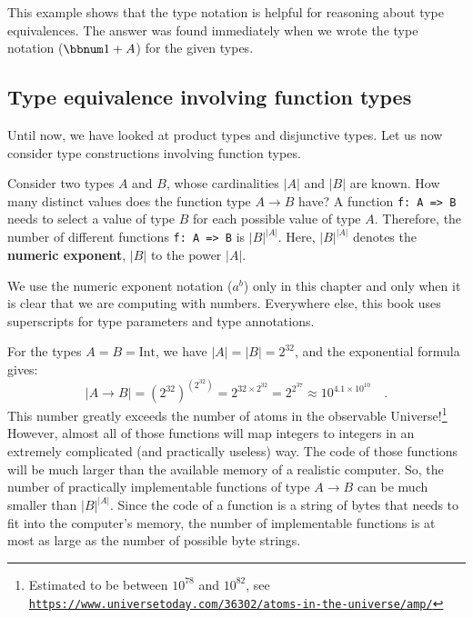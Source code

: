 This example shows that the type notation is helpful for reasoning
about type equivalences. The answer was found immediately when we
wrote the type notation ($\bbnum 1+A$) for the given types.

\subsection{Type equivalence involving function types}

Until now, we have looked at product types and disjunctive types.
Let us now consider type constructions involving function types.

Consider two types $A$ and $B$, whose cardinalities $\left|A\right|$
and $\left|B\right|$ are known. How many distinct values does the
function type $A\rightarrow B$ have? A function \lstinline!f: A => B!
needs to select a value of type $B$ for each possible value of type
$A$. Therefore, the number of different functions \lstinline!f: A => B!
is $\left|B\right|^{\left|A\right|}$. Here, $\left|B\right|^{\left|A\right|}$
denotes the \textbf{numeric exponent}, $\left|B\right|$
to the power $\left|A\right|$.

We use the numeric exponent notation ($a^{b}$) only in this chapter
and only when it is clear that we are computing with numbers. Everywhere
else, this book uses superscripts for type parameters and type annotations.

For the types $A=B=\text{Int}$, we have $\left|A\right|=\left|B\right|=2^{32}$,
and the exponential formula gives:
\[
\left|A\rightarrow B\right|=(2^{32})^{\left(2^{32}\right)}=2^{32\times2^{32}}=2^{2^{37}}\approx10^{4.1\times10^{10}}\quad.
\]
This number greatly exceeds the number of atoms in the observable
Universe!\footnote{Estimated to be between $10^{78}$ and $10^{82}$, see \texttt{\href{https://www.universetoday.com/36302/atoms-in-the-universe/amp/}{https://www.universetoday.com/36302/atoms-in-the-universe/amp/}}}
However, almost all of those functions will map integers to integers
in an extremely complicated (and practically useless) way. The code
of those functions will be much larger than the available memory of
a realistic computer. So, the number of practically implementable
functions of type $A\rightarrow B$ can be much smaller than $\left|B\right|^{\left|A\right|}$.
Since the code of a function is a string of bytes that needs to fit
into the computer\textsf{'}s memory, the number of implementable functions
is at most as large as the number of possible byte strings.

